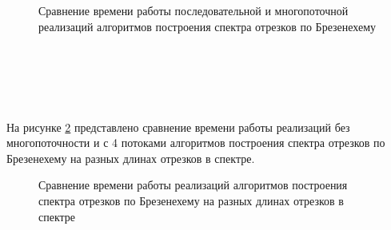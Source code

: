 \begin{figure}[h!]
	
	
	\caption{Сравнение времени работы последовательной и многопоточной реализаций алгоритмов построения спектра отрезков по Брезенехему}
	
	\label{fig:fig1}
	
\end{figure}
\\
\\
\\
\\
\FloatBarrier

На рисунке \ref{fig:fig2} представлено сравнение времени работы реализаций без многопоточности и с 4 потоками алгоритмов построения спектра отрезков по Брезенехему на разных длинах отрезков в спектре.

\FloatBarrier

\begin{figure}[h!]
	
	
	\caption{Сравнение времени работы реализаций алгоритмов построения спектра отрезков по Брезенехему на разных длинах отрезков в спектре}
	
	\label{fig:fig2}
	
\end{figure}

